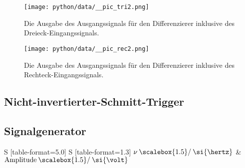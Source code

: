 \begin{figure}[H]
  \centering
  \texttt{[image: python/data/\_\_pic\_tri2.png]}
  \caption{Die Ausgabe des Ausgangssignals für den Differenzierer inklusive des Dreieck-Eingangssignals. }
\label{fig:diff_dre}
\end{figure}


\begin{figure}[H]
  \centering
  \texttt{[image: python/data/\_\_pic\_rec2.png]}
  \caption{Die Ausgabe des Ausgangssignals für den Differenzierer inklusive des Rechteck-Eingangssignals. }
\label{fig:diff_recht}
\end{figure}


\subsection{Nicht-invertierter-Schmitt-Trigger}



\subsection{Signalgenerator}






\begin{table}[ht]
\centering
\small
\caption{Messdaten zur Wien-Robinson-Brücke}
\label{tab:tab2}
\begin{tabular}{S [table-format=5.0] S [table-format=1.3]}
   \toprule
   {$\nu \mathbin{\scalebox{1.5} / } \si{\hertz}$} & $\text{Amplitude} \mathbin{\scalebox{1.5} / } \si{\volt}$\\
   \midrule
\end{tabular}
\end{table} 



